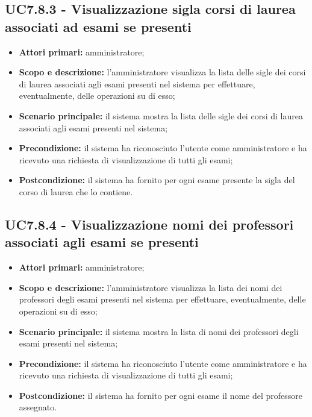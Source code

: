 \documentclass[AnalisiDeiRequisiti.tex]{subfiles}
\begin{document}
\subsection{UC7.8.3 - Visualizzazione sigla corsi di laurea associati ad esami se presenti}
\begin{itemize}
	\item \textbf{Attori primari:} amministratore;
	\item \textbf{Scopo e descrizione:} l'amministratore visualizza la lista delle sigle dei corsi di laurea associati agli esami presenti nel sistema per effettuare, eventualmente, delle operazioni su di esso;
	\item \textbf{Scenario principale:} il sistema mostra la lista delle sigle dei corsi di laurea associati agli esami presenti nel sistema;
	\item \textbf{Precondizione:} il sistema ha riconosciuto l'utente come amministratore e ha ricevuto una richiesta di visualizzazione di tutti gli esami;  
	\item \textbf{Postcondizione:} il sistema ha fornito per ogni esame presente la sigla del corso di laurea che lo contiene.
\end{itemize}
\subsection{UC7.8.4 - Visualizzazione nomi dei professori associati agli esami se presenti}
\begin{itemize}
	\item \textbf{Attori primari:} amministratore;
	\item \textbf{Scopo e descrizione:} l'amministratore visualizza la lista dei nomi dei professori degli esami presenti nel sistema per effettuare, eventualmente, delle operazioni su di esso;
	\item \textbf{Scenario principale:} il sistema mostra la lista di nomi dei professori degli esami presenti nel sistema;
	\item \textbf{Precondizione:} il sistema ha riconosciuto l'utente come amministratore e ha ricevuto una richiesta di visualizzazione di tutti gli esami; 
	\item \textbf{Postcondizione:} il sistema ha fornito per ogni esame il nome del professore assegnato.
\end{itemize}
\end{document}
